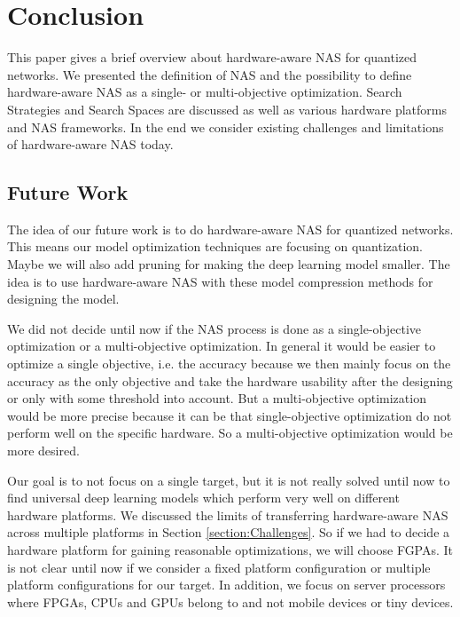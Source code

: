 \documentclass[conference]{IEEEtran}
\begin{document}
\section{Conclusion}

This paper gives a brief overview about hardware-aware NAS for quantized networks. We presented the definition of NAS and the possibility to define hardware-aware NAS as a single- or multi-objective optimization. Search Strategies and Search Spaces are discussed as well as various hardware platforms and NAS frameworks. In the end we consider existing challenges and limitations of hardware-aware NAS today.

\subsection{Future Work}

The idea of our future work is to do hardware-aware NAS for quantized networks. This means our model optimization techniques are focusing on quantization. Maybe we will also add pruning for making the deep learning model smaller. The idea is to use hardware-aware NAS with these model compression methods for designing the model. 

We did not decide until now if the NAS process is done as a single-objective optimization or a multi-objective optimization. In general it would be easier to optimize a single objective, i.e. the accuracy because we then mainly focus on the accuracy as the only objective and take the hardware usability after the designing or only with some threshold into account. But a multi-objective optimization would be more precise because it can be that single-objective optimization do not perform well on the specific hardware. So a multi-objective optimization would be more desired.

Our goal is to not focus on a single target, but it is not really solved until now to find universal deep learning models which perform very well on different hardware platforms. We discussed the limits of transferring hardware-aware NAS across multiple platforms in Section \ref{section:Challenges}. So if we had to decide a hardware platform for gaining reasonable optimizations, we will choose FGPAs. It is not clear until now if we consider a fixed platform configuration or multiple platform configurations for our target. In addition, we focus on server processors where FPGAs, CPUs and GPUs belong to and not mobile devices or tiny devices. 
\end{document}
